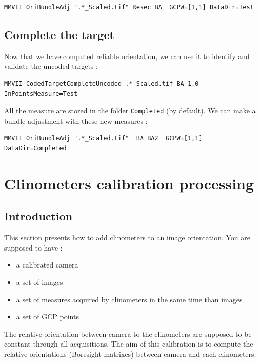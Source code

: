 \begin{lstlisting}
MMVII OriBundleAdj ".*_Scaled.tif" Resec BA  GCPW=[1,1] DataDir=Test
\end{lstlisting}


\subsection{Complete the target}

Now that we have computed reliable  orientation, we can use it to identify and
validate the uncoded targets :

\begin{lstlisting}
MMVII CodedTargetCompleteUncoded .*_Scaled.tif BA 1.0 InPointsMeasure=Test
\end{lstlisting}

All the measure are stored in the  folder {\tt Completed} (by default). We can make a
bundle adjustment with these new measures :

\begin{lstlisting}
MMVII OriBundleAdj ".*_Scaled.tif"  BA BA2  GCPW=[1,1] DataDir=Completed
\end{lstlisting}




\section{Clinometers calibration processing}

\subsection{Introduction}

This section presents how to add clinometers to an image orientation. You are supposed to have :
\begin{itemize}
     \item a calibrated camera
     \item a set of images
     \item a set of measures acquired by clinometers in the same time than images
     \item a set of GCP points
\end{itemize}

The relative orientation between camera to the clinometers are supposed to be constant through all acquisitions.
The aim of this calibration is to compute the relative orientations (Boresight matrixes) between camera and each clinometers.

